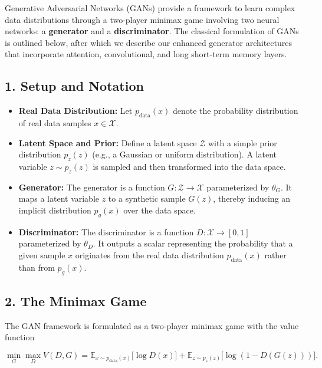 \documentclass{article}
\begin{document}
Generative Adversarial Networks (GANs) provide a framework to learn complex data distributions through a two-player minimax game involving two neural networks: a \textbf{generator} and a \textbf{discriminator}. The classical formulation of GANs is outlined below, after which we describe our enhanced generator architectures that incorporate attention, convolutional, and long short-term memory layers.

\subsection*{1. Setup and Notation}

\begin{itemize}
    \item \textbf{Real Data Distribution:} Let $p_{\text{data}}(x)$ denote the probability distribution of real data samples $x \in \mathcal{X}$.
    \item \textbf{Latent Space and Prior:} Define a latent space $\mathcal{Z}$ with a simple prior distribution $p_z(z)$ (e.g., a Gaussian or uniform distribution). A latent variable $z \sim p_z(z)$ is sampled and then transformed into the data space.
    \item \textbf{Generator:} The generator is a function $G: \mathcal{Z} \to \mathcal{X}$ parameterized by $\theta_G$. It maps a latent variable $z$ to a synthetic sample $G(z)$, thereby inducing an implicit distribution $p_g(x)$ over the data space.
    \item \textbf{Discriminator:} The discriminator is a function $D: \mathcal{X} \to [0,1]$ parameterized by $\theta_D$. It outputs a scalar representing the probability that a given sample $x$ originates from the real data distribution $p_{\text{data}}(x)$ rather than from $p_g(x)$.
\end{itemize}

\subsection*{2. The Minimax Game}

The GAN framework is formulated as a two-player minimax game with the value function

\[
\min_{G} \max_{D} V(D,G) = \mathbb{E}_{x\sim p_{\text{data}}(x)}\big[\log D(x)\big] + \mathbb{E}_{z\sim p_z(z)}\big[\log (1 - D(G(z)))\big].
\]
\end{document}
